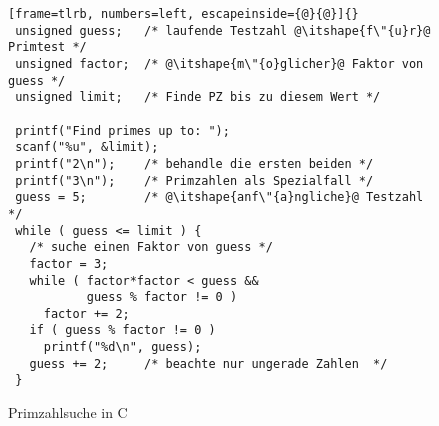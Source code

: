\begin{figure}[ht]
\begin{lstlisting}[frame=tlrb, numbers=left, escapeinside={@}{@}]{}
 unsigned guess;   /* laufende Testzahl @\itshape{f\"{u}r}@ Primtest */
 unsigned factor;  /* @\itshape{m\"{o}glicher}@ Faktor von guess */
 unsigned limit;   /* Finde PZ bis zu diesem Wert */

 printf("Find primes up to: ");
 scanf("%u", &limit);
 printf("2\n");    /* behandle die ersten beiden */
 printf("3\n");    /* Primzahlen als Spezialfall */
 guess = 5;        /* @\itshape{anf\"{a}ngliche}@ Testzahl */
 while ( guess <= limit ) {
   /* suche einen Faktor von guess */
   factor = 3;
   while ( factor*factor < guess &&
           guess % factor != 0 )
     factor += 2;
   if ( guess % factor != 0 )
     printf("%d\n", guess);
   guess += 2;     /* beachte nur ungerade Zahlen  */
 }
\end{lstlisting}
\caption{Primzahlsuche in C}\label{fig:primec}
\end{figure}

